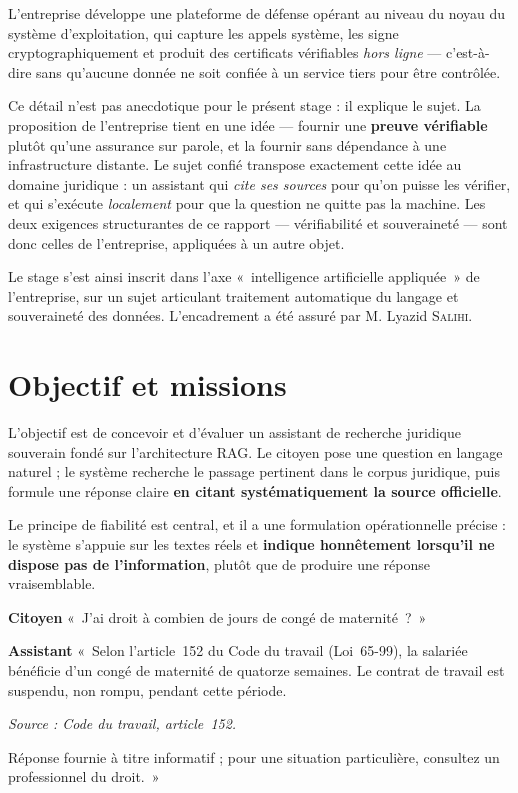 L'entreprise développe une plateforme de défense opérant au niveau du noyau du système
d'exploitation, qui capture les appels système, les signe cryptographiquement et produit des
certificats vérifiables \emph{hors ligne} --- c'est-à-dire sans qu'aucune donnée ne soit confiée à
un service tiers pour être contrôlée.

Ce détail n'est pas anecdotique pour le présent stage : il explique le sujet. La proposition de
l'entreprise tient en une idée --- fournir une \textbf{preuve vérifiable} plutôt qu'une assurance
sur parole, et la fournir sans dépendance à une infrastructure distante. Le sujet confié
transpose exactement cette idée au domaine juridique : un assistant qui \emph{cite ses sources}
pour qu'on puisse les vérifier, et qui s'exécute \emph{localement} pour que la question ne quitte
pas la machine. Les deux exigences structurantes de ce rapport --- vérifiabilité et souveraineté
--- sont donc celles de l'entreprise, appliquées à un autre objet.

Le stage s'est ainsi inscrit dans l'axe «~intelligence artificielle appliquée~» de l'entreprise,
sur un sujet articulant traitement automatique du langage et souveraineté des données.
L'encadrement a été assuré par M. Lyazid \textsc{Salihi}.

\section{Objectif et missions}

L'objectif est de concevoir et d'évaluer un assistant de recherche juridique souverain fondé sur
l'architecture RAG. Le citoyen pose une question en langage naturel ; le système recherche le
passage pertinent dans le corpus juridique, puis formule une réponse claire \textbf{en citant
systématiquement la source officielle}.

Le principe de fiabilité est central, et il a une formulation opérationnelle précise : le système
s'appuie sur les textes réels et \textbf{indique honnêtement lorsqu'il ne dispose pas de
l'information}, plutôt que de produire une réponse vraisemblable.

\begin{encadre}[title=Exemple d'interaction visée]
\textbf{Citoyen} \quad «~J'ai droit à combien de jours de congé de maternité~?~»

\medskip
\textbf{Assistant} \quad «~Selon l'article~152 du Code du travail (Loi~65-99), la salariée
bénéficie d'un congé de maternité de quatorze semaines. Le contrat de travail est suspendu, non
rompu, pendant cette période.

\smallskip
\textit{Source : Code du travail, article~152.}

\smallskip
Réponse fournie à titre informatif ; pour une situation particulière, consultez un
professionnel du droit.~»
\end{encadre}

